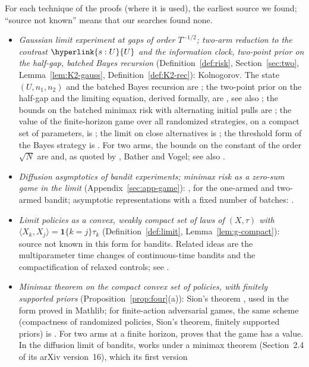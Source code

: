 \documentclass[11pt]{article}
\DeclareRobustCommand{\sy}[2]{{\hyperlink{#1}{#2}}}
\newcommand{\1}{\mathbf{1}}
\newcommand{\Ud}{\sy{s:U}{U}}
\begin{document}
For each technique of the proofs (where it is used), the earliest source we found; ``source not known'' means that our searches found none.
\begin{itemize}
\item \emph{Gaussian limit experiment at gaps of order $T^{-1/2}$; two-arm reduction to the contrast $\Ud$ and the information clock, two-point
prior on the half-gap, batched Bayes recursion} (Definition~\ref{def:risk}, Section~\ref{sec:two}, Lemma~\ref{lem:K2-gauss},
Definition~\ref{def:K2-rec}): Kolnogorov. The state $(U,n_1,n_2)$ and the batched Bayes recursion are \citet[Theorems~1--2]{Kol17}; the two-point prior on
the half-gap and the limiting equation, derived formally, are \citet[(26)--(27)]{Kol17}, see also \citet{Kol16,Kol20}; the bounds on the batched minimax risk
with alternating initial pulls are \citet[Theorem~2]{Kol12}; the value of the finite-horizon game over all randomized strategies, on a compact set of
parameters, is \citet[Theorem~1]{Kol11}; the limit on close alternatives is \citet[Theorem~3]{Kol14}; the threshold form of the Bayes strategy is
\citet[Theorem~2]{Kol15}. For two arms, the bounds on the constant of the order $\sqrt N$ are \citet{FvZ70} and, as quoted by \citet[Theorem~1]{KNS17},
Bather and Vogel; see also \citet{Vog60,Bat83}.
\item \emph{Diffusion asymptotics of bandit experiments; minimax risk as a zero-sum game in the limit} (Appendix~\ref{sec:app-game}):
\citet[Sections~2.4 and~5]{Adu25}, for the one-armed and two-armed bandit; asymptotic representations with a fixed number of batches:
\citet[Theorem~2]{HP23}.
\item \emph{Limit policies as a convex, weakly compact set of laws of $(X,\tau)$ with $\langle X_k,X_j\rangle=\1\{k=j\}\tau_k$}
(Definition~\ref{def:limit}, Lemma~\ref{lem:g-compact}): source not known in this form for bandits. Related ideas are the multiparameter time changes of
continuous-time bandits and the compactification of relaxed controls; see \citet{Man87,EKNJ87}.
\item \emph{Minimax theorem on the compact convex set of policies, with finitely supported priors} (Proposition~\ref{prop:four}(a)): Sion's theorem
\citep{Sio58}, used in the form proved in Mathlib; for finite-action adversarial games, the same scheme (compactness of randomized policies, Sion's theorem,
finitely supported priors) is \citet[Theorem~4.1 and Appendix~A]{LS19}. For two arms at a finite horizon, \citet[Theorem~1]{Kol11} proves that the game
has a value. In the diffusion limit of bandits, \citet{Adu25} works under a minimax theorem (Section~2.4 of its arXiv version~16), which its first version

\end{itemize}
\end{document}
